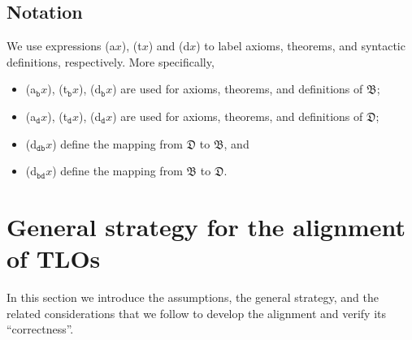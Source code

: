 \documentclass[ao]{iosart2x}
\newcommand{\bfoAxLabel}{\textrm{a$_\texttt{b}$}}
\newcommand{\bfoDefLabel}{\textrm{d$_\texttt{b}$}}
\newcommand{\bfoThrLabel}{\textrm{t$_\texttt{b}$}}
\newcommand{\dolceAxLabel}{\textrm{a$_\texttt{d}$}}
\newcommand{\dolceDefLabel}{\textrm{d$_\texttt{d}$}}
\newcommand{\dolceThrLabel}{\textrm{t$_\texttt{d}$}}
\newcommand{\dbDefLabel}{\textrm{d$_\texttt{db}$}}
\newcommand{\dbThrLabel}{\textrm{t$_\texttt{db}$}}
\newcommand{\dbAxLabel}{\textrm{a}$_\texttt{db}$}
\newcommand{\bdDefLabel}{\textrm{d$_\texttt{bd}$}}
\newcommand{\bdThrLabel}{\textrm{t$_\texttt{bd}$}}
\newcommand{\bdAxLabel}{\textrm{a}$_\texttt{bd}$}
\newcommand{\dolce}{{\textsc{dolce}}}
\newcommand{\bfo}{{\textsc{bfo}}}
\newcommand {\thdolce} {\ensuremath{\mathfrak{D}}}
\newcommand {\thbfo} {\ensuremath{\mathfrak{B}}}
\begin{document}
\subsection{Notation}
We use expressions ({\rm a}$x$), ({\rm t}$x$) and ({\rm d}$x$) to label axioms, theorems, and syntactic definitions, respectively. More specifically,
\begin{itemize}
\item (\bfoAxLabel $x$), (\bfoThrLabel $x$), (\bfoDefLabel $x$) are used for axioms, theorems, and definitions of {$\thbfo$}; 
\item (\dolceAxLabel $x$), (\dolceThrLabel $x$), (\dolceDefLabel $x$) are used for axioms, theorems, and definitions of {$\thdolce$}; 
\item %
(\dbDefLabel $x$) define %
the mapping  from ${\thdolce}$ to ${\thbfo}$, and
\item %
(\bdDefLabel $x$) define %
the mapping  from ${\thbfo}$ to ${\thdolce}$.  
\end{itemize}


\section{General strategy for the alignment of TLOs}\label{sect_methodology}


In this section we introduce the assumptions, the general strategy,  and the related considerations that we follow to develop the alignment and verify its ``correctness''.
\end{document}
